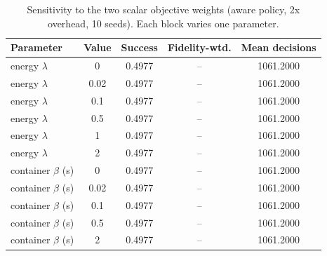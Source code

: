 \begin{table}[t]
\centering
\footnotesize
\caption{Sensitivity to the two scalar objective weights (aware policy, 2x overhead, 10 seeds). Each block varies one parameter.}
\label{tab:p2-weights}
\begin{tabular}{lcccc}
\toprule
Parameter & Value & Success & Fidelity-wtd. & Mean decisions \\
\midrule
energy $\lambda$ & 0 & 0.4977 & -- & 1061.2000 \\
energy $\lambda$ & 0.02 & 0.4977 & -- & 1061.2000 \\
energy $\lambda$ & 0.1 & 0.4977 & -- & 1061.2000 \\
energy $\lambda$ & 0.5 & 0.4977 & -- & 1061.2000 \\
energy $\lambda$ & 1 & 0.4977 & -- & 1061.2000 \\
energy $\lambda$ & 2 & 0.4977 & -- & 1061.2000 \\
container $\beta$ (s) & 0 & 0.4977 & -- & 1061.2000 \\
container $\beta$ (s) & 0.02 & 0.4977 & -- & 1061.2000 \\
container $\beta$ (s) & 0.1 & 0.4977 & -- & 1061.2000 \\
container $\beta$ (s) & 0.5 & 0.4977 & -- & 1061.2000 \\
container $\beta$ (s) & 2 & 0.4977 & -- & 1061.2000 \\
\bottomrule
\end{tabular}
\par\vspace{2pt}{\footnotesize\raggedright If success and the decision counts are flat across a wide weight range, the terms do not change the selected host; that is evidence about this configuration, not about the parameters in general.\par}
\end{table}
